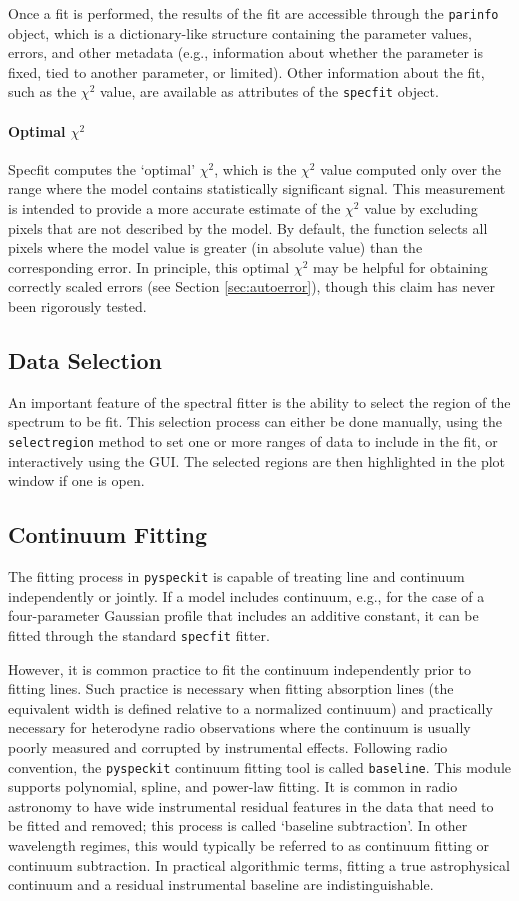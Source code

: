 \documentclass[twocolumn]{aastex63}
\newcommand{\pyspeckit}{\texttt{pyspeckit}\xspace}
\begin{document}
Once a fit is performed, the results of the fit are accessible through the
\texttt{parinfo} object, which is a dictionary-like structure containing
the parameter values, errors, and other metadata (e.g., information about
whether the parameter is fixed, tied to another parameter, or limited).
Other information about the fit, such as the $\chi^2$ value, are available
as attributes of the \texttt{specfit} object.

\paragraph{Optimal $\chi^2$}
Specfit computes the `optimal' $\chi^2$, which is the $\chi^2$
value computed only over the range where the model contains statistically
significant signal.  This measurement is intended to provide a more
accurate estimate of the $\chi^2$ value by excluding pixels that are
not described by the model.  By default, the function selects all pixels where
the model value is greater (in absolute value) than the corresponding error.
In principle, this optimal $\chi^2$ may be helpful for obtaining correctly
scaled errors (see Section \ref{sec:autoerror}), though this claim has never
been rigorously tested.

\subsection{Data Selection}
An important feature of the spectral fitter is the ability to select the region
of the spectrum to be fit.  This selection process can either be done manually,
using the \texttt{selectregion} method to set one or more ranges of data to
include in the fit, or interactively using the GUI.   The selected
regions are then highlighted in the plot window if one is open.

\subsection{Continuum Fitting}
The fitting process in \pyspeckit is capable of treating line and continuum
independently or jointly.  If a model includes continuum, e.g., for the case
of a four-parameter Gaussian profile that includes an additive constant, it
can be fitted through the standard \texttt{specfit} fitter.

However, it is common practice to fit the continuum independently prior to
fitting lines.  Such practice is necessary when fitting absorption lines (the equivalent width is defined relative to a normalized continuum)
and practically necessary for heterodyne radio observations where the
continuum is usually poorly measured and corrupted by instrumental effects.
Following radio convention, the \pyspeckit continuum fitting tool is called
\texttt{baseline}. This module supports polynomial, spline, and power-law
fitting.  It is common in radio astronomy to
have wide instrumental residual features in the data that need to be fitted and
removed; this process is called `baseline subtraction'.  In other wavelength
regimes, this would typically be referred to as continuum fitting or continuum
subtraction.  In practical algorithmic terms, fitting a true astrophysical
continuum and a residual instrumental baseline are indistinguishable.
\end{document}
